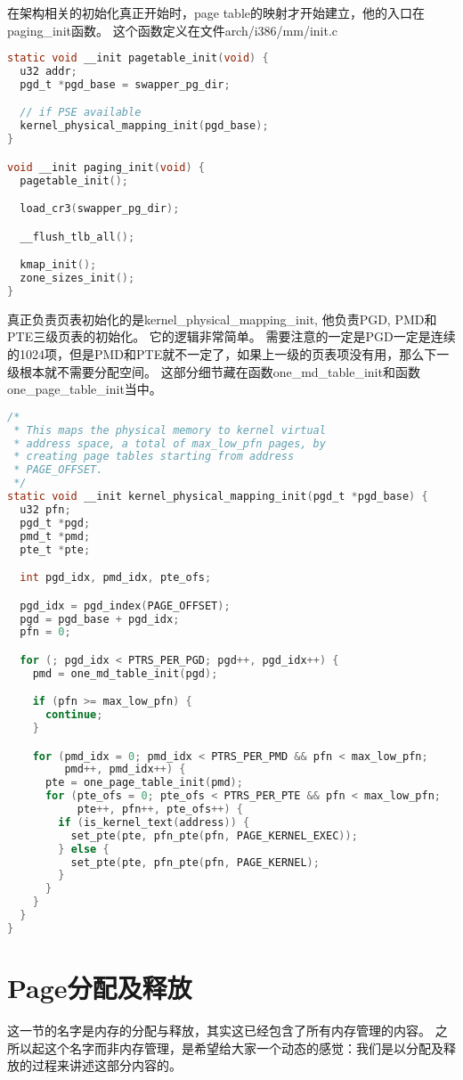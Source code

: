 在架构相关的初始化真正开始时，page table的映射才开始建立，他的入口在paging\_init函数。
这个函数定义在文件arch/i386/mm/init.c

\begin{lstlisting}[language=C]
static void __init pagetable_init(void) {
  u32 addr;
  pgd_t *pgd_base = swapper_pg_dir;

  // if PSE available
  kernel_physical_mapping_init(pgd_base);
}

void __init paging_init(void) {
  pagetable_init();

  load_cr3(swapper_pg_dir);

  __flush_tlb_all();

  kmap_init();
  zone_sizes_init();
}
\end{lstlisting}


真正负责页表初始化的是kernel\_physical\_mapping\_init, 他负责PGD, PMD和PTE三级页表的初始化。
它的逻辑非常简单。
需要注意的一定是PGD一定是连续的1024项，但是PMD和PTE就不一定了，如果上一级的页表项没有用，那么下一级根本就不需要分配空间。
这部分细节藏在函数one\_md\_table\_init和函数one\_page\_table\_init当中。
\begin{lstlisting}[language=C]
/*
 * This maps the physical memory to kernel virtual 
 * address space, a total of max_low_pfn pages, by 
 * creating page tables starting from address
 * PAGE_OFFSET.
 */
static void __init kernel_physical_mapping_init(pgd_t *pgd_base) {
  u32 pfn;
  pgd_t *pgd;
  pmd_t *pmd;
  pte_t *pte;

  int pgd_idx, pmd_idx, pte_ofs;

  pgd_idx = pgd_index(PAGE_OFFSET);
  pgd = pgd_base + pgd_idx;
  pfn = 0;

  for (; pgd_idx < PTRS_PER_PGD; pgd++, pgd_idx++) {
    pmd = one_md_table_init(pgd);

    if (pfn >= max_low_pfn) {
      continue;
    }

    for (pmd_idx = 0; pmd_idx < PTRS_PER_PMD && pfn < max_low_pfn;
         pmd++, pmd_idx++) {
      pte = one_page_table_init(pmd);
      for (pte_ofs = 0; pte_ofs < PTRS_PER_PTE && pfn < max_low_pfn;
           pte++, pfn++, pte_ofs++) {
        if (is_kernel_text(address)) {
          set_pte(pte, pfn_pte(pfn, PAGE_KERNEL_EXEC));
        } else {
          set_pte(pte, pfn_pte(pfn, PAGE_KERNEL);
        }
      }
    }
  }
}
\end{lstlisting}


\section{Page分配及释放}
 这一节的名字是内存的分配与释放，其实这已经包含了所有内存管理的内容。
之所以起这个名字而非内存管理，是希望给大家一个动态的感觉：我们是以分配及释放的过程来讲述这部分内容的。

